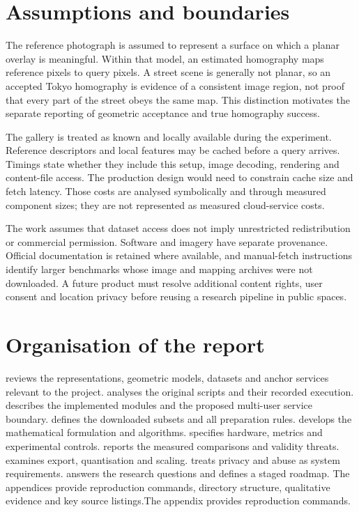 \section{Assumptions and boundaries}
The reference photograph is assumed to represent a surface on which a planar overlay is meaningful. Within that model, an estimated homography maps reference pixels to query pixels. A street scene is generally not planar, so an accepted Tokyo homography is evidence of a consistent image region, not proof that every part of the street obeys the same map. This distinction motivates the separate reporting of geometric acceptance and true homography success.

The gallery is treated as known and locally available during the experiment. Reference descriptors and local features may be cached before a query arrives. Timings state whether they include this setup, image decoding, rendering and content-file access. The production design would need to constrain cache size and fetch latency. Those costs are analysed symbolically and through measured component sizes; they are not represented as measured cloud-service costs.

The work assumes that dataset access does not imply unrestricted redistribution or commercial permission. Software and imagery have separate provenance. Official documentation is retained where available, and manual-fetch instructions identify larger benchmarks whose image and mapping archives were not downloaded. A future product must resolve additional content rights, user consent and location privacy before reusing a research pipeline in public spaces.

\section{Organisation of the report}
 reviews the representations, geometric models, datasets and anchor services relevant to the project.  analyses the original scripts and their recorded execution.  describes the implemented modules and the proposed multi-user service boundary.  defines the downloaded subsets and all preparation rules.  develops the mathematical formulation and algorithms.  specifies hardware, metrics and experimental controls.  reports the measured comparisons and validity threats.  examines export, quantisation and scaling.  treats privacy and abuse as system requirements.  answers the research questions and defines a staged roadmap. \ifFullReport The appendices provide reproduction commands, directory structure, qualitative evidence and key source listings.\else The appendix provides reproduction commands.\fi

